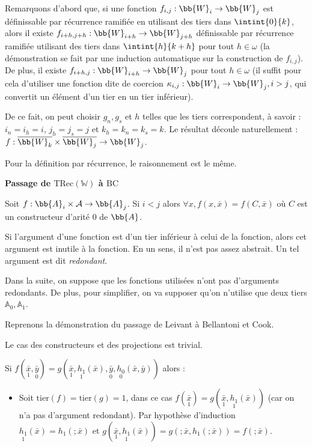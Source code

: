 \documentclass{article}
\newcommand{\bbA}{\mathbb{A}}
\newcommand{\TRec}[1]{\text{TRec}\left(\mathbb{#1}\right)}
\begin{document}
\begin{demo}
			Remarquons d'abord que, si une fonction $f_{i,j} : \bb{W}_i \to \bb{W}_j$ est définissable par récurrence ramifiée en utilisant des tiers dans $\intint{0}{k}$, alors il existe $f_{i+h, j+h} : \bb{W}_{i+h} \to \bb{W}_{j+h}$ définissable par récurrence ramifiée utilisant des tiers dans $\intint{h}{k+h}$ pour tout $h \in \omega$ (la démonstration se fait par une induction automatique sur la construction de $f_{i,j}$). De plus, il existe $f_{i+h,j} : \bb{W}_{i+h} \to \bb{W}_j$ pour tout $h \in \omega$ (il suffit pour cela d'utiliser une fonction dite de coercion $\kappa_{i,j} : \bb{W}_i \to \bb{W}_j, i>j$, qui convertit un élément d'un tier en un tier inférieur).
			
			De ce fait, on peut choisir $g_n, g_s$ et $h$ telles que les tiers correspondent, à savoir : $i_n = i_h = i$, $j_h = j_s = j$ et $k_h = k_n = k_s = k$. Le résultat découle naturellement : $f : \overline{\bb{W}_{k}} \times \overline{\bb{W}_{j}} \to \bb{W}_{j}$.
			
			Pour la définition par récurrence, le raisonnement est le même. 
			
			\espace
			
			\textbf{Passage de $\TRec{W}$ à $\text{BC}$}
			
			\begin{lemma}
				Soit $f : \bb{A}_i \times \mathcal{A} \to \bb{A}_j$. Si $i < j$ alors $\forall x, f(x, \bar{x}) = f(C, \bar{x})$ où $C$ est un constructeur d'arité $0$ de $\bb{A}$.
			\end{lemma}
			
			Si l'argument d'une fonction est d'un tier inférieur à celui de la fonction, alors cet argument est inutile à la fonction. En un sens, il n'est pas assez abstrait. Un tel argument est dit \emph{redondant}.
			
			Dans la suite, on suppose que les fonctions utilisées n'ont pas d'arguments redondants. De plus, pour simplifier, on va supposer qu'on n'utilise que deux tiers $\bbA_0, \bbA_1$.
			
			Reprenons la démonstration du passage de Leivant à Bellantoni et Cook.
			
			Le cas des constructeurs et des projections est trivial.
			
			Si $f(\underset{1}{\bar{x}}, \underset{0}{\bar{y}}) = g( \underset{1}{\bar{x}}, \underset{1}{h_1}(\bar{x}), \underset{0}{\bar{y}}, \underset{0}{h_0}(\bar{x}, \bar{y}))$ alors :
			
			\begin{itemize}[itemsep=-1mm]
				\item 	Soit $\text{tier}(f) = \text{tier}(g) = 1$, dans ce cas $f(\underset{1}{\bar{x}}) = g( \underset{1}{\bar{x}}, \underset{1}{h_1}(\bar{x}))$ (car on n'a pas d'argument redondant). Par hypothèse d'induction $\underset{1}{h_1}(\bar{x}) = h_1(;\bar{x})$ et $g(\underset{1}{\bar{x}}, \underset{1}{h_1}(\bar{x})) = g(; \bar{x}, h_1(;\bar{x})) = f(; \bar{x})$.
				

\end{itemize}
\end{demo}
\end{document}
